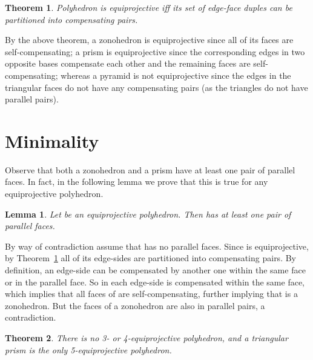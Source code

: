 \documentclass{article}
\newtheorem{lemma}{Lemma}
\newtheorem{theorem}{Theorem}
\newenvironment{proof}
{{\noindent\bf Proof}}{}
\begin{document}
\begin{theorem}{\rm \cite{HL03}}
\label{th:char}
Polyhedron  is equiprojective iff its set of edge-face 
duples can be partitioned into compensating pairs.
\end{theorem}

By the above theorem, 
a zonohedron is equiprojective since all of its faces are self-compensating;
a prism is equiprojective since the corresponding edges in two opposite bases
compensate each other and the remaining faces are self-compensating;
whereas a pyramid is not equiprojective since the edges in the triangular faces
do not have any compensating pairs (as the triangles do not have parallel pairs).  

\section{Minimality}
\label{se:min}

Observe that both a zonohedron and a prism have at least one pair of parallel faces.
In fact, in the following lemma we prove that this is true for any equiprojective polyhedron.


\begin{lemma}
\label{le:two_parallel}
Let  be an equiprojective polyhedron. Then  has at least one pair of parallel faces.
\end{lemma}

\begin{proof}
By way of contradiction assume that  has no parallel faces.
Since  is equiprojective, by Theorem~\ref{th:char} all of its edge-sides are 
partitioned into compensating pairs.
By definition, an edge-side can be compensated by another one within 
the same face or in the parallel face.
So in  each edge-side is compensated within the same face,
which implies that all faces of  are self-compensating,
further implying that  is a zonohedron. 
But the faces of a zonohedron are also in parallel pairs, a contradiction.
\end{proof}

\begin{theorem}
There is no 3- or 4-equiprojective polyhedron, 
and a triangular prism is the only 5-equiprojective polyhedron.
\end{theorem}
\end{document}
